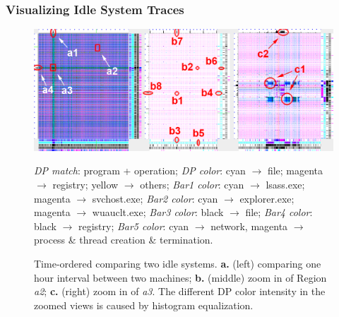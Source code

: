 \subsubsection{Visualizing Idle System Traces}
\label{sec:idle}

\begin{figure}[htb]
\includegraphics[width=1.0\textwidth]{lviz/idle-dp.png}
\caption{Time-ordered \VDP{} comparing two idle systems.
{\bf a.} (left) comparing one hour interval between two machines;
{\bf b.} (middle) zoom in of Region {\em a2};
{\bf c.} (right) zoom in of {\em a3}.
The different DP color intensity in the zoomed views is caused by
histogram equalization.
}
\label{fig:idle-dp}
{\it DP match}: program + operation;
{\it DP color}: cyan $\rightarrow$ file; magenta $\rightarrow$ registry; yellow $\rightarrow$ others;
{\it Bar1 color}: cyan $\rightarrow$ lsass.exe; magenta $\rightarrow$ svchost.exe;
{\it Bar2 color}: cyan $\rightarrow$ explorer.exe; magenta $\rightarrow$ wuauclt.exe;
{\it Bar3 color}: black $\rightarrow$ file;
{\it Bar4 color}: black $\rightarrow$ registry;
{\it Bar5 color}: cyan $\rightarrow$ network, magenta $\rightarrow$ process \& thread creation \& termination.
\end{figure}


